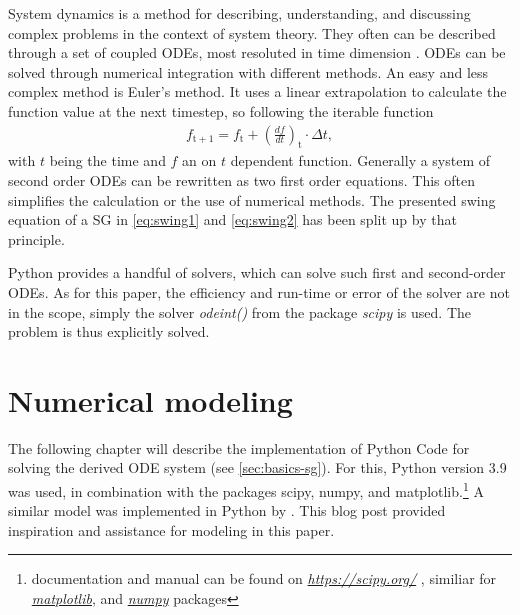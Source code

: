 System dynamics is a method for describing, understanding, and discussing complex problems in the context of system theory. They often can be described through a set of coupled \acfp{ODE}, most resoluted in time dimension \autocite{georgievNumericalAnalysisTime2022}. \acsp{ODE} can be solved through numerical integration with different methods. An easy and less complex method is Euler's method. It uses a linear extrapolation to calculate the function value at the next timestep, so following the iterable function
\begin{align}
        f_\mathrm{t+1}=f_\mathrm{t}+\left(\frac{df}{dt}\right)_\mathrm{t} \cdot \Delta t \label{eq:euler},
\end{align}
with $t$ being the time and $f$ an on $t$ dependent function. Generally a system of second order \acsp{ODE} can be rewritten as two first order equations. This often simplifies the calculation or the use of numerical methods. The presented swing equation of a \acs{SG} in \autoref{eq:swing1} and \autoref{eq:swing2} has been split up by that principle. \autocite{georgievNumericalAnalysisTime2022,griffithsNumericalMethodsOrdinary2010,milesNumericalMethodsPython2023}

Python provides a handful of solvers, which can solve such first and second-order \acsp{ODE}. As for this paper, the efficiency and run-time or error of the solver are not in the scope, simply the solver {\itshape odeint()} from the package {\itshape scipy} is used. The problem is thus explicitly solved. 

\chapter{Numerical modeling}
\label{chap:methods}

The following chapter will describe the implementation of Python Code for solving the derived \acs{ODE} system (see \autoref{sec:basics-sg}). For this, Python version 3.9 was used, in combination with the packages scipy, numpy, and matplotlib.\footnote{documentation and manual can be found on \href{https://scipy.org/}{\itshape https://scipy.org/} \autocite{virtanenSciPyFundamentalAlgorithms2020}, similiar for \href{https://matplotlib.org/}{\itshape matplotlib}, and \href{https://numpy.org/}{\itshape numpy} packages} A similar model was implemented in Python by \textcite{kordowichWattsDynamicPower2023}. This blog post provided inspiration and assistance for modeling in this paper.

